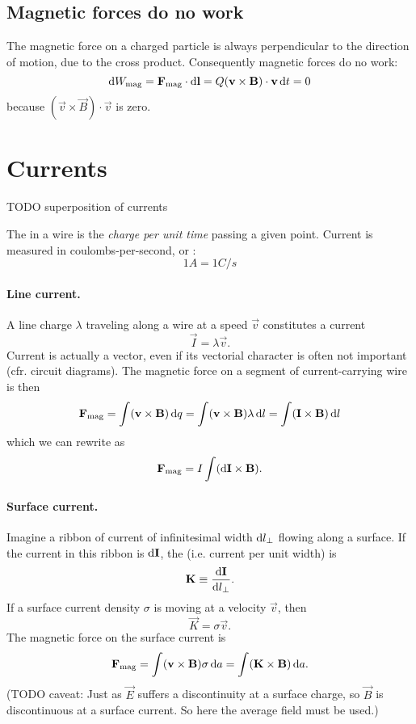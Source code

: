 \subsection{Magnetic forces do no work}
The magnetic force on a charged particle is always perpendicular to the direction of motion, due to the cross product. Consequently magnetic forces do no work:
\[ \operatorname{d \!}{W_\text{mag}} = \bm{\mathrm{F}}_\text{mag}\cdot \operatorname{d \!}{\bm{\mathrm{l}}} = Q(\bm{\mathrm{v}}\times \bm{\mathrm{B}})\cdot \bm{\mathrm{v}}\operatorname{d \!}{t} = 0 \]
because $(\vec{v}\times \vec{B})\cdot \vec{v}$ is zero.

\section{Currents}
TODO superposition of currents

The  in a wire is the \textit{charge per unit time} passing a given point. Current is measured in coulombs-per-second, or :
\[1 \si{A} = 1\si{C\per s}\]

\paragraph{Line current.} A line charge $\lambda$ traveling along a wire at a speed $\vec{v}$ constitutes a current
\[ \vec{I} = \lambda \vec{v}. \]
Current is actually a vector, even if its vectorial character is often not important (cfr. circuit diagrams). The magnetic force on a segment of current-carrying wire is then
\[\bm{\mathrm{F}}_\text{mag} = \int(\bm{\mathrm{v}}\times \bm{\mathrm{B}})\operatorname{d \!}{q} = \int(\bm{\mathrm{v}}\times \bm{\mathrm{B}})\lambda\operatorname{d \!}{l} = \int(\bm{\mathrm{I}}\times \bm{\mathrm{B}})\operatorname{d \!}{l} \]
which we can rewrite as
\[\bm{\mathrm{F}}_\text{mag} = I\int (\operatorname{d \!}{\bm{\mathrm{I}}}\times \bm{\mathrm{B}}). \]
\paragraph{Surface current.}
Imagine a ribbon of current of infinitesimal width $\operatorname{d \!}{l_\perp}$ flowing along a surface. If the current in this ribbon is $\operatorname{d \!}{\bm{\mathrm{I}}}$, the  (i.e. current per unit width) is
\[ \bm{\mathrm{K}} \equiv \frac{\operatorname{d \!}{\bm{\mathrm{I}}}}{\operatorname{d \!}{l_\perp}}. \]
If a surface current density $\sigma$ is moving at a velocity $\vec{v}$, then
\[ \vec{K} = \sigma \vec{v}. \]
The magnetic force on the surface current is
\[ \bm{\mathrm{F}}_\text{mag} = \int (\bm{\mathrm{v}}\times \bm{\mathrm{B}})\sigma \operatorname{d \!}{a} = \int (\bm{\mathrm{K}}\times \bm{\mathrm{B}})\operatorname{d \!}{a}. \]
(TODO caveat: Just as $\vec{E}$ suffers a discontinuity at a surface charge, so $\vec{B}$ is discontinuous at a surface current. So here the average field must be used.)
